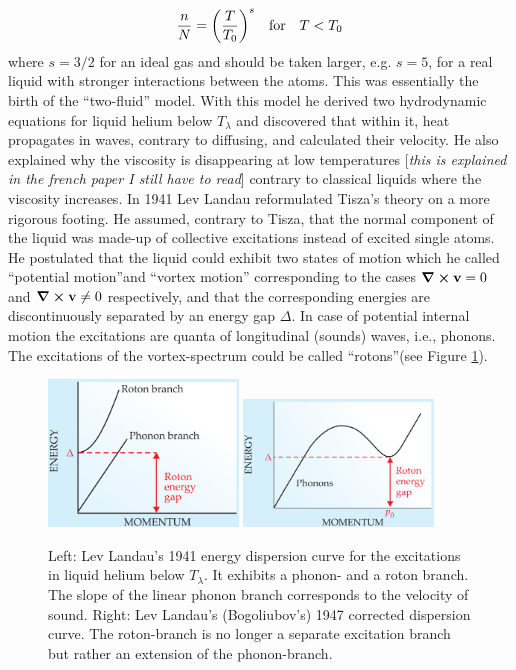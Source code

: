 \documentclass[11pt,a4paper,twoside]{article}
\renewcommand{\vec}[1]{\bm{\mathrm{#1}}}
\begin{document}
	\begin{align}
		\frac{n}{N} = \qty(\frac{T}{T_0})^s \quad \text{for} \quad T<T_0
	\end{align}
	where $s=3/2$ for an ideal gas and should be taken larger, e.g. $s=5$, for a real liquid with stronger interactions between the atoms. This was essentially the birth of the ``two-fluid'' model. With this model he derived two hydrodynamic equations for liquid helium below $T_\lambda$ and discovered that within it, heat propagates in waves, contrary to diffusing, and calculated their velocity. He also explained why the viscosity is disappearing at low temperatures [\emph{this is explained in the french paper I still have to read}] contrary to classical liquids where the viscosity increases. In 1941 Lev Landau reformulated Tisza's theory on a more rigorous footing. He assumed, contrary to Tisza, that the normal component of the liquid was made-up of collective excitations instead of excited single atoms. He postulated that the liquid could exhibit two states of motion which he called ``potential motion''and ``vortex motion'' corresponding to the cases $\curl{\vec{v}}=0$ and $\curl{\vec{v}} \neq 0$ respectively, and that the corresponding energies are discontinuously separated by an energy gap $\Delta$. In case of potential internal motion  the excitations are quanta of longitudinal (sounds) waves, i.e., phonons. The excitations of the vortex-spectrum could be called ``rotons''(see Figure \ref{fig:phonon-roton}).
	\begin{figure}
		\begin{center}
			\includegraphics[width=0.45\textwidth]{phonon-roton-landau-first}
			\includegraphics[width=0.45\textwidth]{phonon-roton-bogoliubov}
		\end{center}
		\caption{Left: Lev Landau's 1941 energy dispersion curve for the excitations in liquid helium below $T_\lambda$. It exhibits a phonon- and a roton branch. The slope of the linear phonon branch corresponds to the velocity of sound. Right: Lev Landau's (Bogoliubov's) 1947 corrected dispersion curve. The roton-branch is no longer a separate excitation branch but rather an extension of the phonon-branch.}
		\label{fig:phonon-roton}
	\end{figure}
\end{document}
